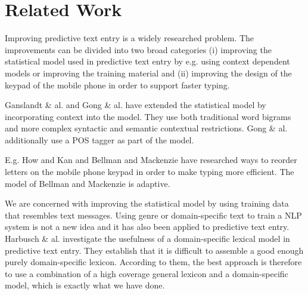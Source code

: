 \documentclass[a4paper,conference]{IEEEtran}
\begin{document}

\section{Related Work}
\label{sec:related-work}

Improving predictive text entry is a widely researched problem. The
improvements can be divided into two broad categories (i) improving
the statistical model used in predictive text entry by e.g. using
context dependent models or improving the training material and (ii)
improving the design of the keypad of the mobile phone in order to
support faster typing.

Ganslandt \& al. \cite{ganslandt/2009} and Gong \&
al. \cite{gong/2008} have extended the statistical model by
incorporating context into the model. They use both traditional word
bigrams and more complex syntactic and semantic contextual
restrictions. Gong \& al. additionally use a POS tagger as part of the
model.

E.g. How and Kan \cite{how05optimizing} and Bellman and Mackenzie
\cite{Department98aprobabilistic} have researched ways to reorder
letters on the mobile phone keypad in order to make typing more
efficient. The model of Bellman and Mackenzie is adaptive.

We are concerned with improving the statistical model by using
training data that resembles text messages. Using genre or
domain-specific text to train a NLP system is not a new idea and it
has also been applied to predictive text entry. Harbusch \&
al. \cite{Harbusch/2003} investigate the usefulness of a
domain-specific lexical model in predictive text entry. They establish
that it is difficult to assemble a good enough purely domain-specific
lexicon. According to them, the best approach is therefore to use a
combination of a high coverage general lexicon and a domain-specific
model, which is exactly what we have done.
\end{document}
